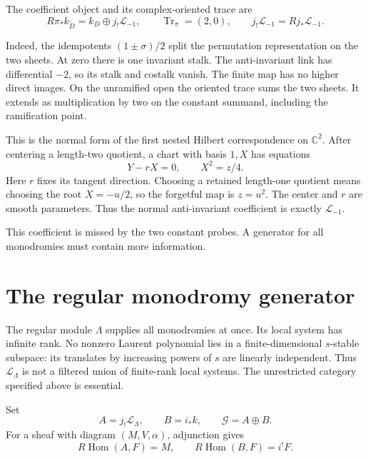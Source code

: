 \begin{example}\label{cyp:ex:ramification}
The coefficient object and its complex-oriented trace are
\[
 R\pi_*k_{\widetilde D}=k_D\oplus j_!\mathcal L_{-1},
 \qquad \operatorname{Tr}_\pi=(2,0),
 \qquad j_!\mathcal L_{-1}=Rj_*\mathcal L_{-1}.
\]

Indeed, the idempotents \((1\pm\sigma)/2\) split the
permutation representation on the two sheets. At zero
there is one invariant stalk. The anti-invariant link has
differential \(-2\), so its stalk and costalk vanish.
The finite map has no higher direct images. On the
unramified open the oriented trace sums the two sheets.
It extends as multiplication by two on the constant
summand, including the ramification point.

This is the normal form of the first nested Hilbert
correspondence on \(\mathbb C^2\). After centering a length-two
quotient, a chart with basis \(1,X\) has equations
\[
                       Y-rX=0,\qquad X^2=z/4.
\]
Here \(r\) fixes its tangent direction. Choosing a retained
length-one quotient means choosing the root \(X=-u/2\),
so the forgetful map is \(z=u^2\). The center and \(r\)
are smooth parameters. Thus the normal anti-invariant
coefficient is exactly \(\mathcal L_{-1}\).
\end{example}

This coefficient is missed by the two constant probes.
A generator for all monodromies must contain more information.

\section{The regular monodromy generator}

The regular module \(\Lambda\) supplies all monodromies at
once. Its local system has infinite rank. No nonzero Laurent
polynomial lies in a finite-dimensional \(s\)-stable subspace:
its translates by increasing powers of \(s\) are linearly
independent. Thus \(\mathcal L_\Lambda\) is not a filtered
union of finite-rank local systems. The unrestricted category
specified above is essential.

Set
\begin{equation}\label{cyp:eq:generator}
 A=j_!\mathcal L_\Lambda,\qquad B=i_*k,
 \qquad \mathcal G=A\oplus B.
\end{equation}
For a sheaf with diagram \((M,V,\alpha)\), adjunction gives
\begin{equation}\label{cyp:eq:probe-values}
 R\operatorname{Hom}(A,F)=M,
 \qquad R\operatorname{Hom}(B,F)=i^!F.
\end{equation}

